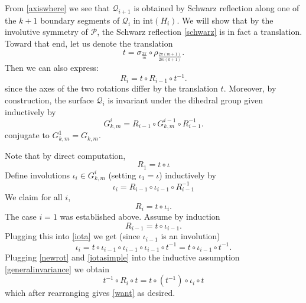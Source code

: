 \documentclass[11pt, reqno]{amsart}
\numberwithin{equation}{section}
\begin{document}
From \eqref{axiswhere} we see that $\mathcal{Q}_{i+1}$ is obtained by Schwarz reflection along one of the $k+1$ boundary segments of $\mathcal{Q}_i$ in $\mbox{int}(H_i)$.   We will show that by the involutive symmetry of $\mathcal{P}$, the Schwarz reflection \eqref{schwarz} is in fact a translation.  Toward that end, let us denote the translation
\begin{equation}
t=\sigma_{\frac{2\pi}{m}}\circ \rho_{\frac{2\pi (m+1)}{2m(k+1)}}.
\end{equation}
Then we can also express:
\begin{equation}\label{newrot}
R_i=t\circ R_{i-1}\circ t^{-1}.
\end{equation}
since the axes of the two rotations differ by the translation $t$.
Moreover, by construction, the surface $\mathcal{Q}_i$ is invariant under the dihedral group given inductively by \begin{equation}G^{i}_{k,m}=R_{i-1}\circ G^
{i-1}_{k,m}\circ R_{i-1}^{-1}.\end{equation} conjugate to $G^1_{k,m}=G_{k,m}$.


Note that by direct computation, 
\begin{equation}
R_1=t\circ \iota
\end{equation}
Define involutions $\iota_i\in G_{k,m}^i$ (setting $\iota_1=\iota$) inductively by
\begin{equation}\label{iota}
\iota_i=R_{i-1}\circ \iota_{i-1}\circ R^{-1}_{i-1}
\end{equation}
We claim for all $i$, 
\begin{equation}\label{want}
R_{i}=t\circ \iota_i.
\end{equation}
The case $i=1$ was established above.  Assume by induction
\begin{equation}\label{generalinvariance}
R_{i-1}=t\circ \iota_{i-1}.
\end{equation} 
Plugging this into \eqref{iota} we get (since $\iota_{i-1}$ is an involution)
\begin{equation}\label{iotasimple}
\iota_i=t\circ \iota_{i-1}\circ\iota_{i-1}\circ\iota_{i-1}\circ t^{-1}=t\circ\iota_{i-1}\circ t^{-1}. 
\end{equation}
Plugging \eqref{newrot} and \eqref{iotasimple} into the inductive assumption \eqref{generalinvariance} we obtain
\begin{equation}
t^{-1}\circ R_i\circ t =t\circ (t^{-1})\circ \iota_{i} \circ t
\end{equation}
which after rearranging gives \eqref{want}
as desired. 
\end{document}
